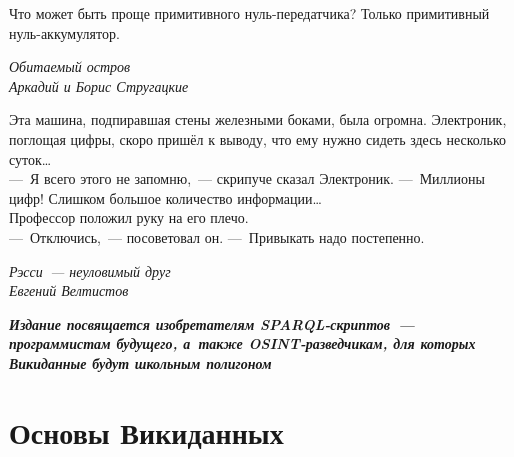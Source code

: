 \documentclass[nofonts,justified,nobib,openany,oneside]{tufte-book}%
\theoremstyle{definition}
\begin{document}
\clearpage
\vfill
\begin{fullwidth}

\makeatletter\setlength\hsize{\@tufte@fullwidth}\makeatother

\renewcommand{\epigraphsize}{\Large}
\renewcommand{\epigraphflush}{flushright}
\setlength{\epigraphwidth}{.7\linewidth}

\epigraph{Что может быть проще примитивного нуль-передатчика? Только примитивный нуль-аккумулятор.}%
{\selectfont%
\textit{Обитаемый остров\\Аркадий и Борис Стругацкие}%
}%

\vspace{36px}

\epigraph{%
Эта машина, подпиравшая стены железными боками, была огромна. Электроник, поглощая цифры, скоро пришёл к выводу, что ему нужно сидеть здесь несколько суток\dots\\
---~Я всего этого не запомню,~--- скрипуче сказал Электроник. ---~Миллионы цифр! Слишком большое количество информации\dots\\
Профессор положил руку на его плечо.\\
---~Отключись,~--- посоветовал он. ---~Привыкать надо постепенно.}%
{\selectfont%
\textit{Рэсси~--- неуловимый друг\\Евгений Велтистов}%
}%

    
\vspace{56px}


\setlength{\epigraphrule}{0pt} %
\epigraph{%
{\selectfont%
\textit{\textbf{Издание посвящается изобретателям SPARQL-скриптов~--- программистам будущего, 
а~также OSINT-разведчикам, для которых Викиданные будут школьным полигоном}}%
}%
}{}
\end{fullwidth}





\mainmatter






\part{Основы Викиданных}%
\label{part:foundation}%
\end{document}
